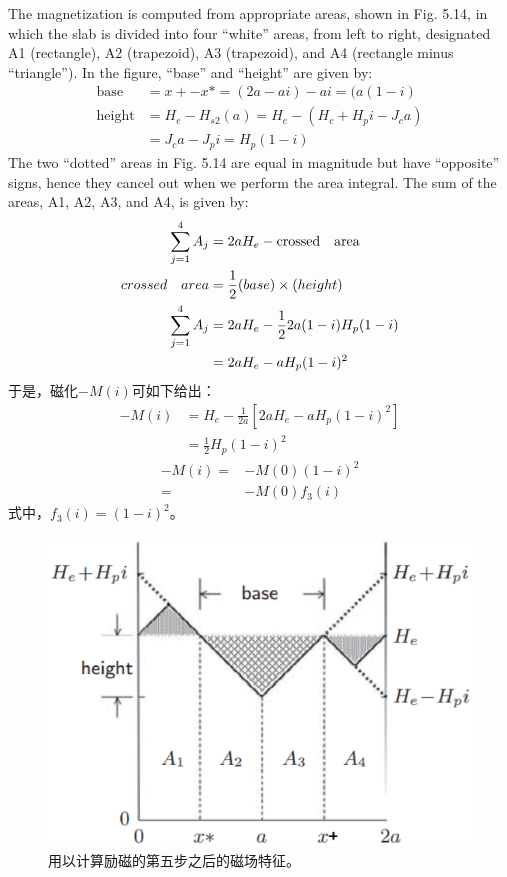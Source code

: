 The magnetization is computed from appropriate areas, shown in Fig. 5.14, in
which the slab is divided into four “white” areas, from left to right, designated A1
(rectangle), A2 (trapezoid), A3 (trapezoid), and A4 (rectangle minus “triangle”).
In the figure, “base” and “height” are given by:
\begin{align*}
\text{base}&=x+-x*=(2a-ai)-ai=(a(1-i)\\
\text{height}&=H_{e}-H_{s2}(a)=H_{e}-(H_{e}+H_{p}i-J_{c}a)\\
&=J_{c}a-J_{p}i=H_{p}(1-i)
\end{align*}
The two “dotted” areas in Fig. 5.14 are equal in magnitude but have “opposite”
signs, hence they cancel out when we perform the area integral. The sum of the
areas, A1, A2, A3, and A4, is given by:
\begin{align*}
\sum_{j=1}^{4}A_{j}&=2aH_{e}-\text{crossed\quad area}\\
crossed\quad area&=\frac{1}{2}(base)\times(height)\\
\sum_{j=1}^{4}A_{j}&=2aH_{e}-\frac{1}{2}2a(1-i)H_{p}(1-i)\\
&=2aH_{e}-aH_{p}(1-i)^{2}
\end{align*}
于是，磁化$−M(i)$可如下给出：
\begin{align*}%
-M(i)&=H_{e}-\frac{1}{2a}[2aH_{e}-a \grave{}H_{p}(1-i)^{2}]\\
&=\frac{1}{2}H_{p}(1-i)^{2}
\end{align*}
\begin{subequations}
	\begin{align*}
-M(i)=&-M(0)(1-i)^{2}\\
=&-M(0)f_{3}(i)
	\end{align*}
\end{subequations}
式中，$f_3(i) = (1 − i)^2$。

\begin{figure}[htbp]
	\centering
	\includegraphics[scale=0.7]{chpt5/figs/fig5.14.eps}
	\caption{用以计算励磁的第五步之后的磁场特征。}
\end{figure}

